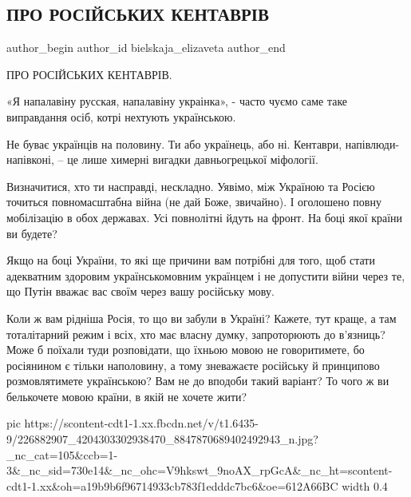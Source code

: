  
 
 
 
 
 
\subsection{ПРО РОСІЙСЬКИХ КЕНТАВРІВ}
\label{sec:30_07_2021.fb.bielskaja_elizaveta.1.ros_kentavry}
 
\ifcmt
 author_begin
   author_id bielskaja_elizaveta
 author_end
\fi

ПРО РОСІЙСЬКИХ КЕНТАВРІВ.

«Я напалавіну русская, напалавіну украінка», - часто чуємо саме таке виправдання осіб, котрі нехтують українською. 

Не буває українців на половину. Ти або українець, або ні. Кентаври,
напівлюди-напівконі, – це лише химерні вигадки давньогрецької міфології. 

Визначитися, хто ти насправді, нескладно. Уявімо, між Україною та Росією
точиться повномасштабна війна (не дай Боже, звичайно). І оголошено повну
мобілізацію в обох державах. Усі повнолітні йдуть на фронт. На боці якої країни
ви будете? 

Якщо на боці України, то які ще причини вам потрібні для того, щоб стати
адекватним здоровим українськомовним українцем і не допустити війни через те,
що Путін вважає вас своїм через вашу російську мову. 

Коли ж вам рідніша Росія, то що ви забули в Україні? Кажете, тут краще, а там
тоталітарний режим і всіх, хто має власну думку, запроторюють до в’язниць? Може
б поїхали туди розповідати, що їхньою мовою не говоритимете, бо росіянином є
тільки наполовину, а тому зневажаєте російську й принципово розмовлятимете
українською? Вам не до вподоби такий варіант? То чого ж ви белькочете мовою
країни, в якій не хочете жити? 

\ifcmt
  pic https://scontent-cdt1-1.xx.fbcdn.net/v/t1.6435-9/226882907_4204303302938470_8847870689402492943_n.jpg?_nc_cat=105&ccb=1-3&_nc_sid=730e14&_nc_ohc=V9hkswt_9noAX_rpGcA&_nc_ht=scontent-cdt1-1.xx&oh=a19b9b6f96714933cb783f1edddc7bc6&oe=612A66BC
  width 0.4
\fi

